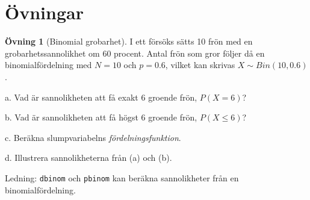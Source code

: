 \documentclass[
]{book}
\theoremstyle{definition}
\theoremstyle{definition}
\theoremstyle{definition}
\newtheorem{exercise}{Övning}[chapter]
\theoremstyle{definition}
\theoremstyle{remark}
\begin{document}
\hypertarget{uxf6vningar}{%
\section{Övningar}\label{uxf6vningar}}

\begin{exercise}[Binomial grobarhet]
I ett försöks sätts 10 frön med en grobarhetssannolikhet om 60 procent. Antal frön som gror följer då en binomialfördelning med \(N = 10\) och \(p = 0.6\), vilket kan skrivas \(X \sim Bin(10, 0.6)\).

a. Vad är sannolikheten att få exakt 6 groende frön, \(P(X = 6)\)?

b. Vad är sannolikheten att få högst 6 groende frön, \(P(X \leq 6)\)?

c. Beräkna slumpvariabelns \emph{fördelningsfunktion}.

d. Illustrera sannolikheterna från (a) och (b).

Ledning: \texttt{dbinom} och \texttt{pbinom} kan beräkna sannolikheter från en binomialfördelning.
\end{exercise}
\end{document}
